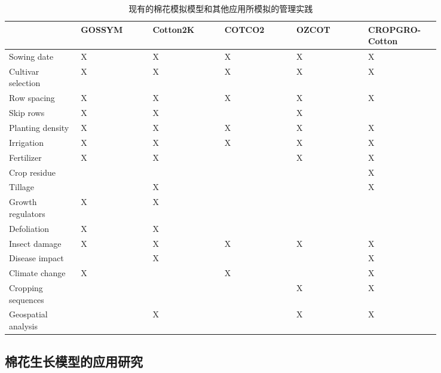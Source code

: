 \begin{table}
    \caption{现有的棉花模拟模型和其他应用所模拟的管理实践}\label{tab:agromanagement}
    \begin{tabular}{p{0.14\linewidth}p{0.14\linewidth}p{0.14\linewidth}p{0.14\linewidth}p{0.14\linewidth}p{0.14\linewidth}}
        \toprule
                            & GOSSYM & Cotton2K & COTCO2 & OZCOT & CROPGRO-Cotton \\
        \midrule
        Sowing date         & X      & X        & X      & X     & X              \\
        Cultivar selection  & X      & X        & X      & X     & X              \\
        Row spacing         & X      & X        & X      & X     & X              \\
        Skip rows           & X      & X        &        & X     &                \\
        Planting density    & X      & X        & X      & X     & X              \\
        Irrigation          & X      & X        & X      & X     & X              \\
        Fertilizer          & X      & X        &        & X     & X              \\
        Crop residue        &        &          &        &       & X              \\
        Tillage             &        & X        &        &       & X              \\
        Growth regulators   & X      & X        &        &       &                \\
        Defoliation         & X      & X        &        &       &                \\
        Insect damage       & X      & X        & X      & X     & X              \\
        Disease impact      &        & X        &        &       & X              \\
        Climate change      & X      &          & X      &       & X              \\
        Cropping sequences  &        &          &        & X     & X              \\
        Geospatial analysis &        & X        &        & X     & X              \\
        \bottomrule
    \end{tabular}
\end{table}
\subsection{棉花生长模型的应用研究}

